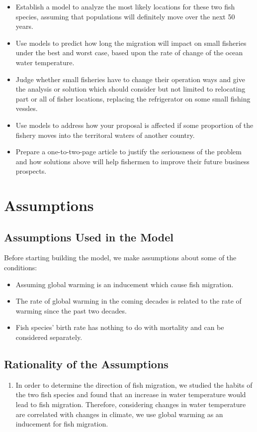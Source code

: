 \documentclass{mcmthesis}
\begin{document}
\begin{itemize}
	\item Establish a model to analyze the most likely locations for these two fish species, assuming that populations will definitely move over the next 50 years.
	\item Use models to predict how long the migration will impact on small fisheries under the best and worst case, based upon the rate of change of the ocean water temperature.
	\item Judge whether small fisheries have to change their operation ways and give the analysis or solution which should consider but not limited to relocating part or all of fisher locations, replacing the refrigerator on some small fishing vessles.
	\item Use models to address how your proposal is affected if some proportion of the fishery moves into the territoral waters of another country.
	\item Prepare a one-to-two-page article to justify the seriousness of the problem and how solutions above will help fishermen to improve their future business prospects.
\end{itemize}

\section{Assumptions}
\subsection{Assumptions Used in the Model}
Before starting building the model, we make assumptions about some of the conditions:

\begin{itemize}
	\item Assuming global warming is an inducement which cause fish migration.
	\item The rate of global warming in the coming decades is related to the rate of warming since the past two decades.
	\item Fish species' birth rate has nothing to do with mortality and can be considered separately.
\end{itemize}

\subsection{Rationality of the Assumptions}
\begin{enumerate}
	\item In order to determine the direction of fish migration, we studied the habits of the two fish species and found that an increase in water temperature would lead to fish migration. Therefore, considering changes in water temperature are correlated with changes in climate, we use global warming as an inducement for fish migration.
\end{enumerate}
\end{document}
